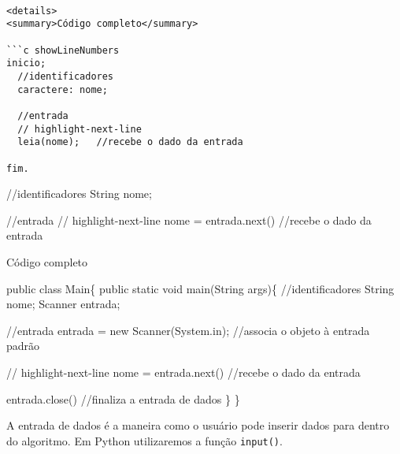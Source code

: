 \documentclass[
  letterpaper,
  DIV=11,
  numbers=noendperiod]{scrreprt}
\newenvironment{Shaded}{\begin{snugshade}}{\end{snugshade}}
\newcommand{\AttributeTok}[1]{\textcolor[rgb]{0.40,0.45,0.13}{#1}}
\newcommand{\BuiltInTok}[1]{\textcolor[rgb]{0.00,0.23,0.31}{#1}}
\newcommand{\CommentTok}[1]{\textcolor[rgb]{0.37,0.37,0.37}{#1}}
\newcommand{\FunctionTok}[1]{\textcolor[rgb]{0.28,0.35,0.67}{#1}}
\newcommand{\KeywordTok}[1]{\textcolor[rgb]{0.00,0.23,0.31}{#1}}
\newcommand{\NormalTok}[1]{\textcolor[rgb]{0.00,0.23,0.31}{#1}}
\newcommand{\OperatorTok}[1]{\textcolor[rgb]{0.37,0.37,0.37}{#1}}
\begin{document}
\begin{verbatim}

<details>
<summary>Código completo</summary>

```c showLineNumbers
inicio;
  //identificadores
  caractere: nome;

  //entrada
  // highlight-next-line
  leia(nome);   //recebe o dado da entrada

fim.
\end{verbatim}

\begin{Shaded}
\begin{Highlighting}[]
\CommentTok{//identificadores}
\BuiltInTok{String}\NormalTok{ nome}\OperatorTok{;}

\CommentTok{//entrada}
\CommentTok{// highlight{-}next{-}line}
\NormalTok{nome }\OperatorTok{=}\NormalTok{ entrada}\OperatorTok{.}\FunctionTok{next}\NormalTok{()   }\CommentTok{//recebe o dado da entrada}
\end{Highlighting}
\end{Shaded}

Código completo

\begin{Shaded}
\begin{Highlighting}[]
  \KeywordTok{public} \KeywordTok{class}\NormalTok{ Main\{}
    \KeywordTok{public} \KeywordTok{static} \KeywordTok{void} \FunctionTok{main}\NormalTok{(}\BuiltInTok{String}\NormalTok{ args)\{}
      \CommentTok{//identificadores}
      \BuiltInTok{String}\NormalTok{ nome}\OperatorTok{;}
\NormalTok{      Scanner entrada}\OperatorTok{;}

      \CommentTok{//entrada}
\NormalTok{      entrada }\OperatorTok{=} \KeywordTok{new} \FunctionTok{Scanner}\NormalTok{(System}\OperatorTok{.}\AttributeTok{in}\NormalTok{)}\OperatorTok{;} \CommentTok{//associa o objeto à entrada padrão}

      \CommentTok{// highlight{-}next{-}line}
\NormalTok{      nome }\OperatorTok{=}\NormalTok{ entrada}\OperatorTok{.}\FunctionTok{next}\NormalTok{()   }\CommentTok{//recebe o dado da entrada}

\NormalTok{      entrada}\OperatorTok{.}\FunctionTok{close}\NormalTok{()         }\CommentTok{//finaliza a entrada de dados}
\NormalTok{    \}}
\NormalTok{  \}}
\end{Highlighting}
\end{Shaded}

A entrada de dados é a maneira como o usuário pode inserir dados para
dentro do algoritmo. Em Python utilizaremos a função \texttt{input()}.
\end{document}
